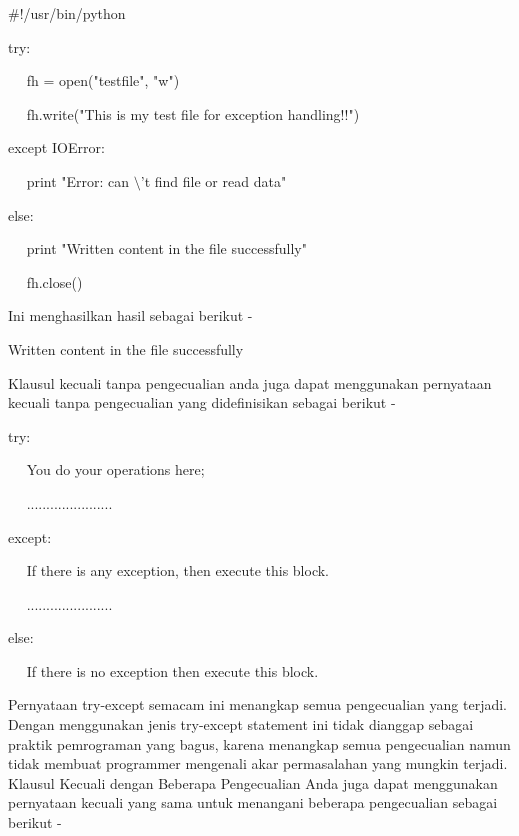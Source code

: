 \vspace{16pt}
\noindent 
 $  \#  $!/usr/bin/python \par
\vspace{12pt}
\noindent 
try: \par
\noindent 
~~ fh = open("testfile", "w") \par
\noindent 
~~ fh.write("This is my test file for exception handling!!") \par
\noindent 
except IOError: \par
\noindent 
~~ print "Error: can $  \setminus  $'t find file or read data" \par
\noindent 
else: \par
\noindent 
~~ print "Written content in the file successfully" \par
\noindent 
~~ fh.close() \par
\vspace{16pt}
\noindent 
Ini menghasilkan hasil sebagai berikut - \par
\vspace{12pt}
\noindent 
Written content in the file successfully \par
\vspace{12pt}
\noindent 
Klausul kecuali tanpa pengecualian anda juga dapat menggunakan pernyataan kecuali tanpa pengecualian yang didefinisikan sebagai berikut - \par
\vspace{12pt}
\noindent 
try: \par
\noindent 
~~ You do your operations here; \par
\noindent 
~~ ...................... \par
\noindent 
except: \par
\noindent 
~~ If there is any exception, then execute this block. \par
\noindent 
~~ ...................... \par
\noindent 
else: \par
\noindent 
~~ If there is no exception then execute this block.  \par
\vspace{12pt}
\vspace{16pt}
\noindent 
 \hspace*{0.5in} Pernyataan try-except semacam ini menangkap semua pengecualian yang terjadi. Dengan menggunakan jenis try-except statement ini tidak dianggap sebagai praktik pemrograman yang bagus, karena menangkap semua pengecualian namun tidak membuat programmer mengenali akar permasalahan yang mungkin terjadi. Klausul Kecuali dengan Beberapa Pengecualian Anda juga dapat menggunakan pernyataan kecuali yang sama untuk menangani beberapa pengecualian sebagai berikut - \par
